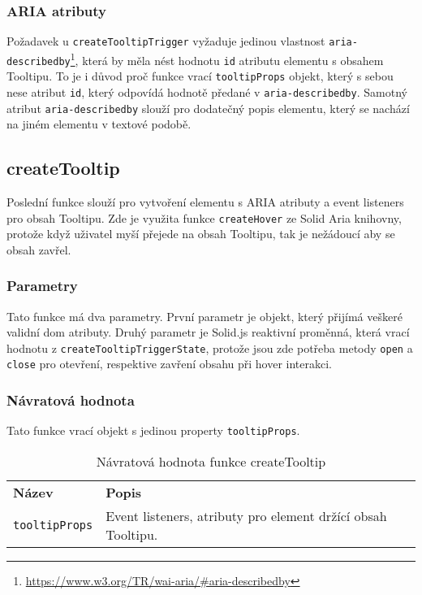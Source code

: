 \subsubsection{ARIA atributy}

Požadavek \hyperref[ofr12]{} u \texttt{createTooltipTrigger} vyžaduje jedinou vlastnost \texttt{aria-describedby}\footnote{\url{https://www.w3.org/TR/wai-aria/\#aria-describedby}}, která by měla nést hodnotu \texttt{id} atributu elementu s obsahem Tooltipu.
To je i důvod proč funkce vrací \texttt{tooltipProps} objekt, který s sebou nese atribut \texttt{id}, který odpovídá hodnotě předané v \texttt{aria-describedby}.
Samotný atribut \texttt{aria-describedby} slouží pro dodatečný popis elementu, který se nachází na jiném elementu v textové podobě.

\subsection{createTooltip}

Poslední funkce slouží pro vytvoření elementu s ARIA atributy a event listeners pro obsah Tooltipu.
Zde je využita funkce \texttt{createHover} ze Solid Aria knihovny, protože když uživatel myší přejede na obsah Tooltipu, tak je nežádoucí aby se obsah zavřel.

\subsubsection{Parametry}

Tato funkce má dva parametry.
První parametr je objekt, který přijímá veškeré validní \gls{dom} atributy.
Druhý parametr je Solid.js reaktivní proměnná, která vrací hodnotu z \texttt{createTooltipTriggerState}, protože jsou zde potřeba metody \texttt{open} a \texttt{close} pro otevření, respektive zavření obsahu při hover interakci.

\subsubsection{Návratová hodnota}

Tato funkce vrací objekt s jedinou property \texttt{tooltipProps}.

\begin{table}[ht]
    \begin{ctucolortab}
        \begin{tabularx}{\textwidth}{p{3cm} X}
            \bfseries Název       & \bfseries Popis                                              \\\Midrule{}
            \texttt{tooltipProps} & Event listeners, atributy pro element držící obsah Tooltipu.
        \end{tabularx}
    \end{ctucolortab}
    \caption{Návratová hodnota funkce createTooltip}
    \label{table:tooltip-return}
\end{table}

